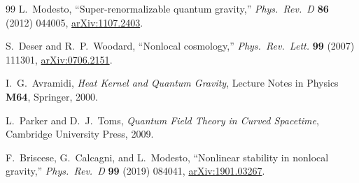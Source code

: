 \documentclass[11pt,a4paper]{article}
\theoremstyle{plain}
\theoremstyle{definition}
\begin{document}
\begin{thebibliography}{99}
L.~Modesto,
``Super-renormalizable quantum gravity,''
\emph{Phys.\ Rev.\ D} \textbf{86} (2012) 044005,
\href{https://arxiv.org/abs/1107.2403}{arXiv:1107.2403}.

S.~Deser and R.~P.~Woodard,
``Nonlocal cosmology,''
\emph{Phys.\ Rev.\ Lett.} \textbf{99} (2007) 111301,
\href{https://arxiv.org/abs/0706.2151}{arXiv:0706.2151}.

I.~G.~Avramidi,
\emph{Heat Kernel and Quantum Gravity},
Lecture Notes in Physics \textbf{M64}, Springer, 2000.

L.~Parker and D.~J.~Toms,
\emph{Quantum Field Theory in Curved Spacetime},
Cambridge University Press, 2009.

F.~Briscese, G.~Calcagni, and L.~Modesto,
``Nonlinear stability in nonlocal gravity,''
\emph{Phys.\ Rev.\ D} \textbf{99} (2019) 084041,
\href{https://arxiv.org/abs/1901.03267}{arXiv:1901.03267}.

\end{thebibliography}
\end{document}
